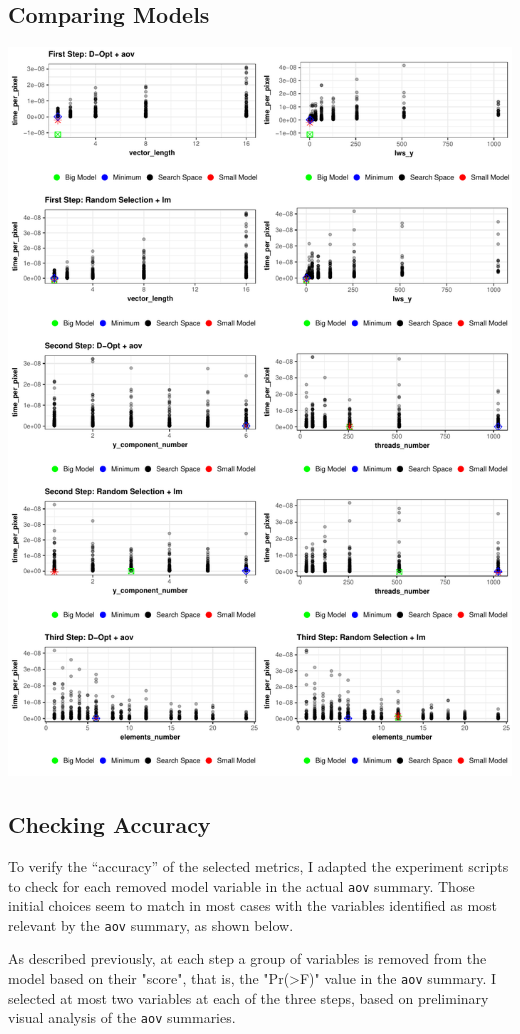 \documentclass[final,12pt,a4paper]{article}
\begin{document}
\subsection{Comparing Models}
\label{sec:org23bad93}
\begin{center}
\includegraphics[width=.9\linewidth]{../img/model_comparison.pdf}
\end{center}
\subsection{Checking Accuracy}
\label{sec:org1ca0c82}
To verify the ``accuracy'' of the selected metrics, I adapted the experiment
scripts to check for each removed model variable in the actual \texttt{aov} summary.
Those initial choices seem to match in most cases with the variables identified
as most relevant by the \texttt{aov} summary, as shown below.

As described previously, at each step a group of variables is removed from the
model based on their "score", that is, the "Pr(>F)" value in the \texttt{aov} summary.
I selected at most two variables at each of the three steps, based on preliminary
visual analysis of the \texttt{aov} summaries.
\end{document}
